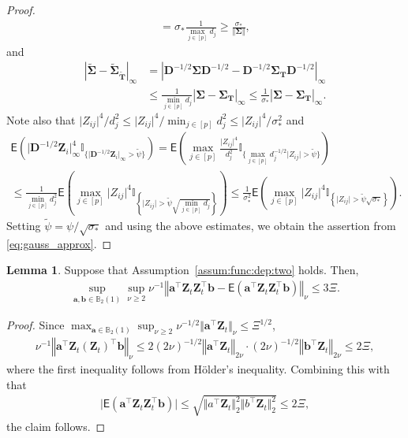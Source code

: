 \documentclass[11pt, a4paper]{article}
\newcommand{\mbf}{\mathbf}
\renewcommand{\l}{\left}
\renewcommand{\r}{\right}
\def\wt{\widetilde}
\newcommand{\E}[0]{\mathsf{E}}
\theoremstyle{definition}
\theoremstyle{definition}
\theoremstyle{definition}
\newtheorem{lem}[thm]{Lemma}
\theoremstyle{definition}
\theoremstyle{definition}
\theoremstyle{remark}
\theoremstyle{definition}
\theoremstyle{definition}
\theoremstyle{definition}
\begin{document}
\begin{proof}
\begin{align*}
	= \sigma_*\frac{1}{\max_{j \in [p]}d_j}\ge \frac{\sigma_*}{\Vert\mbf \Sigma\Vert},
	\end{align*}
	and
	\begin{align*}
	\l\vert\wt{\mbf \Sigma}-\wt{\mbf \Sigma}_{\wt{\mbf T}}\r\vert_{\infty} & = \l\vert\mbf D^{-1/2}{\mbf \Sigma}\mbf D^{-1/2}-\mbf D^{-1/2}{\mbf \Sigma}_{\mbf T}\mbf D^{-1/2}\r\vert_{\infty} \\
	&\le \frac{1}{\min_{j \in [p]}d_j}\l\vert\mbf\Sigma -\mbf\Sigma_{\mbf T}\r\vert_\infty \le \frac{1}{\sigma_*}\l\vert\mbf\Sigma -\mbf\Sigma_{\mbf T}\r\vert_\infty.
	\end{align*}
	Note also that $\vert Z_{ij}\vert^4/d_j^2\le \vert Z_{ij}\vert^4/\min_{j \in [p]}d_j^2\le \vert Z_{ij}\vert^4/\sigma_*^2$ and 
	\begin{multline*}
	\E\l(\vert \mbf D^{-1/2}\mbf Z_{i}\vert_{\infty}^4 \mathbb{I}_{\{\vert \mbf D^{-1/2}\mbf Z_{i}\vert_{\infty} > \wt\psi\}}\r) = \E\l(\max_{j \in [p]}\frac{\vert Z_{ij}\vert^4}{d_j^2} \mathbb{I}_{\{\max_{j \in [p]}d_j^{-1/2}\vert Z_{ij}\vert > \wt\psi\}}\r) \\
	\le \frac{1}{\min_{j \in [p]}d_j^2}\E\l(\max_{j \in [p]}\vert Z_{ij}\vert^4 \mathbb{I}_{\l\{\vert Z_{ij}\vert > \wt\psi\sqrt{\min_{j \in [p]}d_j}\r\}}\r) \le \frac{1}{\sigma_*^2}\E\l(\max_{j \in [p]}\vert Z_{ij}\vert^4 \mathbb{I}_{\l\{\vert Z_{ij}\vert > \wt\psi\sqrt{\sigma_*}\r\}}\r).
	\end{multline*}
	Setting $\wt\psi = \psi/\sqrt{\sigma_*}$ and using the above estimates, we obtain the assertion from \eqref{eq:gauss_approx}. 
\end{proof}

\begin{lem}
	\label{lem:assum:func:two} 
	Suppose that Assumption~\ref{assum:func:dep:two} holds. Then,
	\begin{align*}
	\sup_{\mbf a, \mbf b \in \mathbb{B}_2(1)} \sup_{\nu \ge 2} \nu^{-1} \l\Vert \mbf a^\top \mbf Z_t\mbf Z_t^\top \mbf b - \E\l( \mbf a^\top \mbf Z_t\mbf Z_t^\top \mbf b \r) \r\Vert_\nu \le 3\Xi.
	\end{align*}
\end{lem}

\begin{proof}
	Since $\max_{\mbf a \in \mathbb{B}_2(1)} \sup_{\nu \ge 2} \nu^{-1/2} \Vert \mbf a^\top \mbf Z_t \Vert_\nu \le \Xi^{1/2}$,
	\begin{align*}
	\nu^{-1} \l\Vert \mbf a^\top \mbf Z_t (\mbf Z_t)^\top \mbf b \r\Vert_\nu 
	\le 2 (2\nu)^{-1/2} \l\Vert \mbf a^\top \mbf Z_t \r\Vert_{2\nu} \cdot (2\nu)^{-1/2} \l\Vert \mbf b^\top \mbf Z_t \r\Vert_{2\nu}
	\le 2 \Xi, 
	\end{align*}
	where the first inequality follows from H\"older's inequality.
	Combining this with that 
	\begin{align*}
	\vert \E(\mbf a^\top \mbf Z_t \mbf Z_t^\top \mbf b) \vert \le \sqrt{\Vert a^\top \mbf Z_t \Vert_2^2 \Vert b^\top \mbf Z_t \Vert_2^2 } \le 2\Xi, 
	\end{align*}
	the claim follows.
\end{proof}
\end{document}
